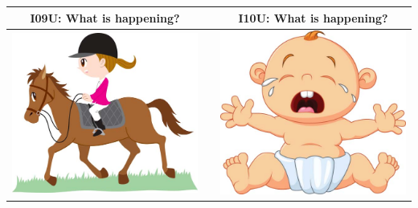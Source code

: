 \documentclass[12pt,notitlepage]{article}
\begin{document}
\begin{center}
\begin{tabular}{|c|c|c|}
\hline
I09U: What is happening? && I10U: What is happening? \\
\hline
\includegraphics[width=20em,trim=0 0 0 -3]{figures/I09.jpg} & & \includegraphics[width=20em,trim=0 0 0 -3]{figures/I10.jpg} \\
\hline
\end{tabular}
\vspace{1em} \\



\end{center}
\end{document}
